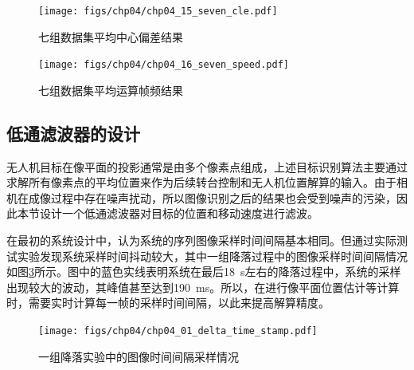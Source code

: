 \begin{figure}[ht]   
	\centering
	\texttt{[image: figs/chp04/chp04\_15\_seven\_cle.pdf]}
	\caption{七组数据集平均中心偏差结果}
	\label{fig:chp04_15_seven_cle}
\end{figure}

\begin{figure}[ht]   
	\centering
	\texttt{[image: figs/chp04/chp04\_16\_seven\_speed.pdf]}
	\caption{七组数据集平均运算帧频结果}
	\label{fig:chp04_16_seven_speed}
\end{figure}



\subsection{低通滤波器的设计}
无人机目标在像平面的投影通常是由多个像素点组成，上述目标识别算法主要通过求解所有像素点的平均位置来作为后续转台控制和无人机位置解算的输入。由于相机在成像过程中存在噪声扰动，所以图像识别之后的结果也会受到噪声的污染，因此本节设计一个低通滤波器对目标的位置和移动速度进行滤波。

在最初的系统设计中，认为系统的序列图像采样时间间隔基本相同。但通过实际测试实验发现系统采样时间抖动较大，其中一组降落过程中的图像采样时间间隔情况如图\ref{fig:chp04_01_delta_time_stamp}所示。图中的蓝色实线表明系统在最后18\ s左右的降落过程中，系统的采样出现较大的波动，其峰值甚至达到190\ ms。所以，在进行像平面位置估计等计算时，需要实时计算每一帧的采样时间间隔，以此来提高解算精度。

\begin{figure}[ht]   
	\centering
	\texttt{[image: figs/chp04/chp04\_01\_delta\_time\_stamp.pdf]}
	\caption{一组降落实验中的图像时间间隔采样情况}
	\label{fig:chp04_01_delta_time_stamp}
\end{figure}

